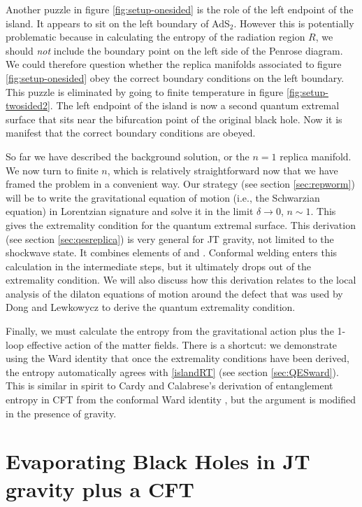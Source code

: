\documentclass[12pt]{article}
\numberwithin{equation}{section}
\begin{document}
\begin{spacing}{1.1}
Another puzzle in figure \ref{fig:setup-onesided} is the role of the left endpoint of the island. It appears to sit on the left boundary of AdS$_2$. However this is potentially problematic because in calculating the entropy of the radiation region $R$, we should \textit{not} include the boundary point on the left side of the Penrose diagram. We could therefore question whether the replica manifolds associated to figure \ref{fig:setup-onesided}  obey the correct boundary conditions on the left boundary. This puzzle is eliminated by going to finite temperature in figure \ref{fig:setup-twosided2}. The left endpoint of the island is now a second quantum extremal surface that sits near the bifurcation point of the original black hole. Now it is manifest that the correct boundary conditions are obeyed.



So far we have described the background solution, or the $n=1$ replica manifold. We now turn to finite $n$, which is relatively straightforward now that we have framed the problem in a convenient way. Our strategy (see section \ref{sec:repworm}) will be to write the gravitational equation of motion (i.e., the Schwarzian equation) in Lorentzian signature and solve it in the limit $\delta \to 0$, $n \sim 1$. This gives the extremality condition for the quantum extremal surface. This derivation (see section \ref{sec:qesreplica}) is very general for JT gravity, not limited to the shockwave state. It combines elements of \cite{Almheiri:2019qdq} and \cite{Penington:2019kki}. Conformal welding enters this calculation in the intermediate steps, but it ultimately drops out of the extremality condition. We will also discuss how this derivation relates to the local analysis of the dilaton equations of motion around the defect that was used by Dong and Lewkowycz \cite{Dong:2017xht} to derive the quantum extremality condition. 

Finally, we must calculate the entropy from the gravitational action plus the 1-loop effective action of the matter fields. There is a shortcut: we demonstrate using the Ward identity that once the extremality conditions have been derived, the entropy automatically agrees with \eqref{islandRT} (see section \ref{sec:QESward}). This is similar in spirit to Cardy and Calabrese's derivation of entanglement entropy in CFT from the conformal Ward identity \cite{Calabrese:2004eu}, but the argument is modified in the presence of gravity. 




\section{Evaporating Black Holes in JT  gravity plus a CFT}\label{sec2}


\end{spacing}
\end{document}
